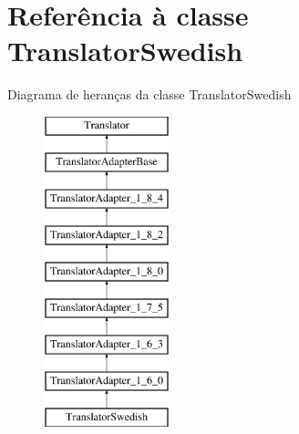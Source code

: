 \hypertarget{class_translator_swedish}{\section{Referência à classe Translator\-Swedish}
\label{class_translator_swedish}
}
Diagrama de heranças da classe Translator\-Swedish\begin{figure}[H]
\begin{center}
\leavevmode
\includegraphics[height=9.000000cm]{class_translator_swedish}
\end{center}
\end{figure}
